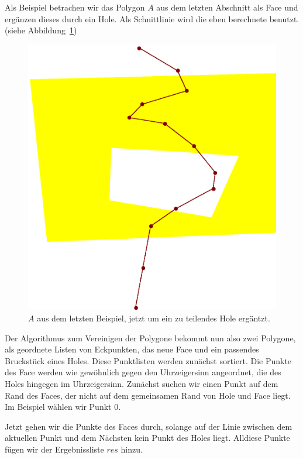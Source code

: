 Als Beispiel betrachen wir das Polygon $A$ aus dem letzten Abschnitt als Face und ergänzen dieses durch ein Hole. Als Schnittlinie wird die eben berechnete benutzt. (siehe Abbildung~\ref{fig:JLL1})

\begin{figure}
	\centering
	\includegraphics[scale=0.6]{JLL1.svg.eps}
	\caption[EinFace mit einem Hole wird geteilt]{$A$ aus dem letzten Beispiel, jetzt um ein zu teilendes Hole ergäntzt.}
	\label{fig:JLL1}
\end{figure}

Der Algorithmus zum Vereinigen der Polygone bekommt nun also zwei Polygone, als geordnete Listen von Eckpunkten, das neue Face und ein passendes Bruckstück eines Holes. Diese Punktlisten werden zunächst sortiert. Die Punkte des Face werden wie gewöhnlich gegen den Uhrzeigersinn  angeordnet, die des Holes hingegen im Uhrzeigersinn. Zunächst suchen wir einen Punkt auf dem Rand des Faces, der nicht auf dem gemeinsamen Rand von Hole und Face liegt. Im Beispiel wählen wir Punkt 0.

Jetzt gehen wir die Punkte des Faces durch, solange auf der Linie zwischen dem aktuellen Punkt und dem Nächsten kein Punkt des Holes liegt. Alldiese Punkte fügen wir der Ergebnissliste $res$ hinzu.

